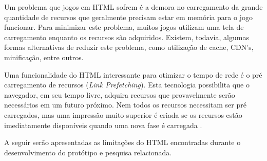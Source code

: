 Um problema que jogos em HTML sofrem é a demora no carregamento
da grande quantidade de recursos que geralmente precisam estar em
memória para o jogo funcionar. Para minimizar este problema, muitos
jogos utilizam uma tela de carregamento enquanto os recursos são
adquiridos. Existem, todavia, algumas formas alternativas de reduzir 
este problema, como utilização de cache, CDN's, minificação, entre
outros.

Uma funcionalidade do HTML interessante para otimizar o tempo de
rede é o pré carregamento de recursos (\textit{Link Prefetching}).
Esta tecnologia possibilita que o navegador, em seu tempo livre,
adquira recursos que provavelmente serão necessários em um futuro
próximo. Nem todos os recursos necessitam ser pré carregados,
mas uma impressão muito superior é criada se os recursos estão
imediatamente disponíveis quando uma nova fase é carregada
\textsc{\autocite[p. 39]{creatingFun}}.

A seguir serão apresentadas as limitações do HTML encontradas durante
o desenvolvimento do protótipo e pesquisa relacionada.

